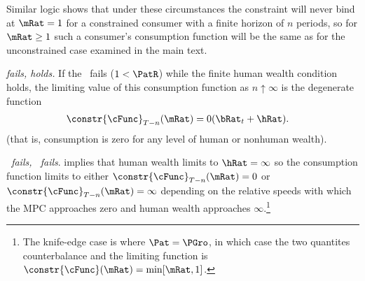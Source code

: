 \documentclass[\econtexRoot/BufferStockTheory]{subfiles}
\begin{document}
Similar logic shows that under these circumstances the constraint will
never bind at $\mRat=1$ for a constrained consumer with a finite horizon of $n$
periods, so for $\mRat \geq 1$ such a consumer's consumption function will be the same as for the
unconstrained case examined in the main text.

\hypertarget{cnclPFGICcnclRICFHWC}{}
\textit{{\RIC} fails, {\FHWC} holds.} If the \RIC~fails ($1 < \PatR$) while the finite human wealth condition
holds, the limiting value of this consumption function as $n \uparrow
\infty$ is the degenerate function
\begin{equation}\begin{gathered}\begin{aligned}
  \constr{\cFunc}_{T-n}(\mRat)  & = 0 (\bRat_{t}+\hRat).
\end{aligned}\end{gathered}\end{equation}
(that is, consumption is zero for any level of human or nonhuman wealth).

\hypertarget{cnclPFGICcnclRICcnclFHWC}{}
\textit{{\RIC}~fails, {\FHWC}~fails}. {\cncl{\FHWC}} implies that human wealth limits to $\hRat =
\infty$ so the consumption function limits to either
$\constr{\cFunc}_{T-n}(\mRat) = 0$ or
$\constr{\cFunc}_{T-n}(\mRat) = \infty$ depending on the relative
speeds with which the MPC approaches zero and human wealth approaches
$\infty$.\footnote{The knife-edge case is where $\Pat = \PGro$, in
  which case the two quantites counterbalance and the limiting
  function is $\constr{\cFunc}(\mRat)=\min[\mRat,1]$.}

\let\TableWidth\relax
\newlength\TableWidth
\end{document}
